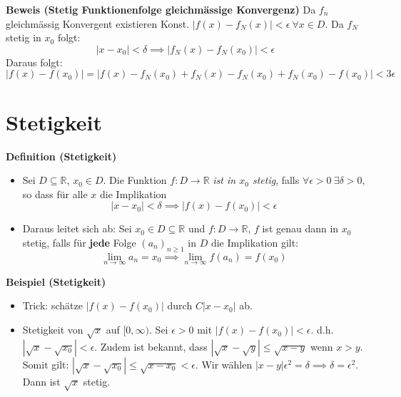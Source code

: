 \documentclass[25pt]{sciposter}
\newcommand{\limm}{\lim\limits_{n \to \infty}}
\newcommand{\R}{\mathbb{R}}
\newenvironment{method}[1]{\begin{mdframed}[backgroundcolor=blue!10,innertopmargin=15pt, innerbottommargin=15pt, nobreak=true]
		\textbf{#1 }
	}
	{ 
	\end{mdframed}
}
\begin{document}
\begin{multicols}{3}
\textbf{Beweis (Stetig Funktionenfolge gleichmässige Konvergenz)}
Da $f_n$ gleichmässig Konvergent existieren Konst. $|f(x) - f_N(x)| < \epsilon \ \forall x \in D$. Da $f_N$ stetig in $x_0$ folgt:
$$|x - x_0| < \delta \implies |f_N(x) - f_N(x_0)| < \epsilon$$
Daraus folgt: $$|f(x) - f(x_0)| = |f(x) - f_N(x_0) + f_N(x) - f_N(x_0) + f_N(x_0) - f(x_0)| < 3 \epsilon$$














\section{Stetigkeit}
\begin{method}{Definition (Stetigkeit)}
	\begin{itemize}
		\item Sei $D \subseteq \mathbb{R}$, $x_0 \in D$. Die Funktion $f:D \to \R$ \textit{ist in $x_0$ stetig}, falls $\forall \epsilon > 0 \ \exists \delta > 0$, so dass für alle $x$ die Implikation $$|x-x_0| < \delta \implies |f(x) - f(x_0)| < \epsilon$$
		
		\item Daraus leitet sich ab: Sei $x_0 \in D \subseteq \R$ und $f:D \to \R$, $f$ ist genau dann in $x_0$ stetig, falls für \textbf{jede} Folge $(a_n)_{n \geq 1}$ in $D$ die Implikation gilt:$$\lim\limits_{n \to \infty} a_n = x_0 \implies \limm f(a_n) = f(x_0)$$
	\end{itemize}

\end{method}

\textbf{Beispiel (Stetigkeit)}
\begin{itemize}
	\item Trick: schätze $|f(x)-f(x_0)|$ durch $C|x-x_0|$ ab. 
	\item Stetigkeit von $\sqrt{x}$ auf $[0, \infty)$. Sei $\epsilon > 0 $ mit $|f(x)-f(x_0)| < \epsilon$. d.h. $|\sqrt{x} - \sqrt{x_0}|< \epsilon$. Zudem ist bekannt, dass $|\sqrt{x} - \sqrt{y}|\leq\sqrt{x-y}$ wenn $x > y$. Somit gilt: $|\sqrt{x} - \sqrt{x_0}|\leq \sqrt{x - x_0}<\epsilon$. Wir wählen $|x-y|\epsilon^2 = \delta \implies \delta = \epsilon^2$. Dann ist $\sqrt{x}$ stetig.
\end{itemize}


\end{multicols}
\end{document}
